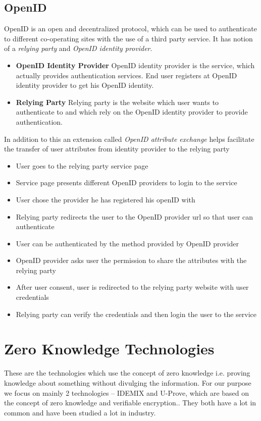 \subsection{OpenID}
OpenID is an open and decentralized protocol, which can be used to authenticate to different co-operating sites with the use of a third party service. It has notion of a \textit{relying party} and \textit{OpenID identity provider}.
\begin{itemize}
\item \textbf{OpenID Identity Provider} OpenID identity provider is the service, which actually provides authentication services. End user registers at OpenID identity provider to get his OpenID identity.
\item \textbf{Relying Party} Relying party is the website which user wants to authenticate to and which rely on the OpenID identity provider to provide authentication.
\end{itemize}
In addition to this an extension called \textit{OpenID attribute exchange} helps facilitate the transfer of user attributes from identity provider to the relying party
\begin{itemize}
\item User goes to the relying party service page
\item Service page presents different OpenID providers to login to the service
\item User chose the provider he has registered his openID with
\item Relying party redirects the user to the OpenID provider url so that user can authenticate
\item User can be authenticated by the method provided by OpenID provider
\item OpenID provider asks user the permission to share the attributes with the relying party
\item After user consent, user is redirected to the relying party website with user credentials
\item Relying party can verify the credentials and then login the user to the service
\end{itemize}
\section{Zero Knowledge Technologies}
These are the technologies which use the concept of zero knowledge i.e. proving knowledge about something without divulging the information. For our purpose we focus on mainly 2 technologies – IDEMIX and U-Prove, which are based on the concept of zero knowledge and verifiable encryption.. They both have a lot in common and have been studied a lot in industry. 
